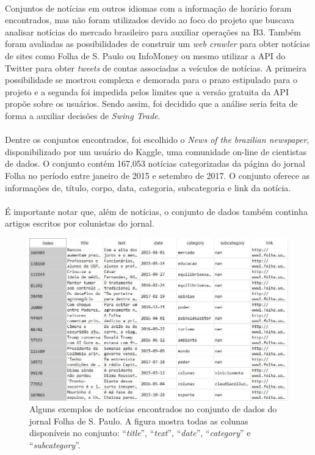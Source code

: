 \documentclass[grad,numbers]{coppe}
\begin{document}
	  	\paragraph{}Conjuntos de notícias em outros idiomas com a informação de horário foram encontrados, mas não foram utilizados devido ao foco do projeto que buscava analisar notícias do mercado brasileiro para auxiliar operações na B3. Também foram avaliadas as possibilidades de construir um \textit{web crawler} para obter notícias de sites como Folha de S. Paulo\cite{folha} ou InfoMoney\cite{infomoney} ou mesmo utilizar a API do Twitter\cite{twitter-api} para obter \textit{tweets} de contas associadas a veículos de notícias. A primeira possibilidade se mostrou complexa e demorada para o prazo estipulado para o projeto e a segunda foi impedida pelos limites que a versão gratuita da API propõe sobre os usuários. Sendo assim, foi decidido que a análise seria feita de forma a auxiliar decisões de \textit{Swing Trade}.
	  	\paragraph{}Dentre os conjuntos encontrados, foi escolhido o \textit{News of the brazilian newspaper}\cite{folha-news-dataset}, disponibilizado por um usuário do Kaggle, uma comunidade on-line de cientistas de dados. O conjunto contém 167,053 notícias categorizadas da página do jornal Folha no período entre janeiro de 2015 e setembro de 2017. O conjunto oferece as informações de, título, corpo, data, categoria, subcategoria e link da notícia.
	  	\paragraph{}É importante notar que, além de notícias, o conjunto de dados também continha artigos escritos por colunistas do jornal.
	  	\begin{figure}[h]
	  		\includegraphics[width=15cm]{folha-dataset}
	  		\caption{Alguns exemplos de notícias encontrados no conjunto de dados do jornal Folha de S. Paulo. A figura mostra todas as colunas disponíveis no conjunto: ``\textit{title}'', ``\textit{text}'', ``\textit{date}'', ``\textit{category}'' e ``\textit{subcategory}''.}
	  		\label{fig:folha-dataset-fig}
	  	\end{figure}
\end{document}
